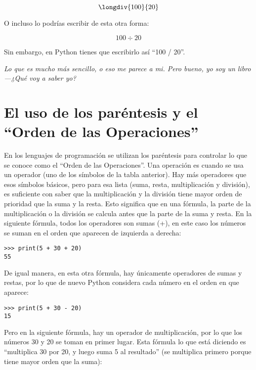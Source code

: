 \begin{displaymath}
\longdiv{100}{20}
\end{displaymath}

O incluso lo podrías escribir de esta otra forma:

\begin{displaymath}
100 \div 20
\end{displaymath}

Sin embargo, en Python tienes que escribirlo así ``100 / 20''.

\emph{Lo que es mucho más sencillo, o eso me parece a mi.  Pero bueno, yo soy un libro---¿Qué voy a saber yo?}

\section{El uso de los paréntesis y el ``Orden de las Operaciones''}

En los lenguajes de programación se utilizan los paréntesis para controlar lo que se conoce como el ``Orden de las Operaciones''.  Una operación es cuando se usa un operador (uno de los símbolos de la tabla anterior).  Hay más operadores que esos símbolos básicos, pero para esa lista (suma, resta, multiplicación y división), es suficiente con saber que la multiplicación y la división tiene mayor orden de prioridad que la suma y la resta. Esto significa que en una fórmula, la parte de la multiplicación o la división se calcula antes que la parte de la suma y resta.  En la siguiente fórmula, todos los operadores son sumas (+), en este caso los números se suman en el orden que aparecen de izquierda a derecha:

\begin{listing}
\begin{verbatim}
>>> print(5 + 30 + 20)
55
\end{verbatim}
\end{listing}

\noindent
De igual manera, en esta otra fórmula, hay únicamente operadores de sumas y restas, por lo que de nuevo Python considera cada número en el orden en que aparece:

\begin{listing}
\begin{verbatim}
>>> print(5 + 30 - 20)
15
\end{verbatim}
\end{listing}

\noindent
Pero en la siguiente fórmula, hay un operador de multiplicación, por lo que los números 30 y 20 se toman en primer lugar. Esta fórmula lo que está diciendo es ``multiplica 30 por 20, y luego suma 5 al resultado'' (se multiplica primero porque tiene mayor orden que la suma): 

